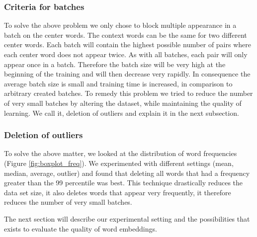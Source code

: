 \subsubsection{Criteria for batches}
To solve the above problem we only chose to block multiple appearance in a batch on the center words. The context words can be the same for two different center words.  Each batch will contain the highest possible number of pairs where each center word does not appear twice. As with all batches, each pair will only appear once in a batch. Therefore the batch size will be very high at the beginning of the training and will then decrease very rapidly. In consequence the average batch size is small and training time is increased, in comparison to arbitrary created batches. To remedy this problem we tried to reduce the number of very small batches by altering the dataset, while maintaining the quality of learning. We call it, deletion of outliers and explain it in the next subsection. 
\subsubsection{Deletion of outliers}
To solve the above matter, we looked  at the distribution of word frequencies (Figure \ref{fig:boxplot_freq}). We experimented with different settings (mean, median, average, outlier) and found that deleting all words that had a frequency greater than the 99 percentile was best. 
This technique drastically reduces the data set size, it also deletes words that appear very frequently, it therefore reduces the number of very small batches. 

The next section will describe our experimental setting and the possibilities that exists to evaluate the quality of word embeddings. 